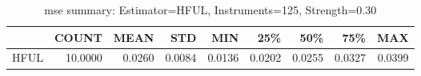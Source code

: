 \begin{table}[ht]
\centering
\caption{mse summary: Estimator=HFUL, Instruments=125, Strength=0.30}
\begin{tabular}{lrrrrrrrr}
\toprule
 & COUNT & MEAN & STD & MIN & 25\% & 50\% & 75\% & MAX \\
\midrule
HFUL & 10.0000 & 0.0260 & 0.0084 & 0.0136 & 0.0202 & 0.0255 & 0.0327 & 0.0399 \\
\bottomrule
\end{tabular}
\end{table}
